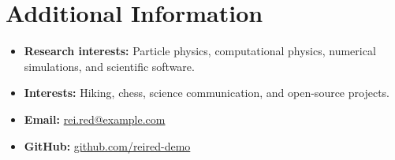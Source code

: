 \documentclass[11pt]{article}
\begin{document}

\section{
    \texorpdfstring{
        \makebox[\widthof{\faInfo}][c]{
            \color{NA_Red}{\faInfo}
        }\quad Additional Information
    }{
        Additional Information
    }
}

\begin{itemize}
    \item \textbf{Research interests:} Particle physics, computational
    physics, numerical simulations, and scientific software.
    \item \textbf{Interests:} Hiking, chess, science communication,
    and open-source projects.
    \item \textbf{Email:}
    \href{mailto:rei.red@example.com}{rei.red@example.com}
    \item \textbf{GitHub:}
    \href{https://github.com/reired-demo}{github.com/reired-demo}
\end{itemize}
\end{document}
